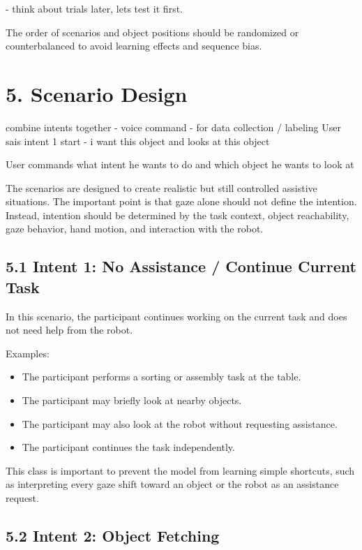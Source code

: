 \documentclass[11pt,a4paper]{article}
\begin{document}
- think about trials later, lets test it first.

The order of scenarios and object positions should be randomized or counterbalanced to avoid learning effects and sequence bias.

\section*{5. Scenario Design}

combine intents together
- voice command - for data collection / labeling 
User sais intent 1 start - i want this object and looks at this object

User commands what intent he wants to do and which object he wants to look at

The scenarios are designed to create realistic but still controlled assistive situations. The important point is that gaze alone should not define the intention. Instead, intention should be determined by the task context, object reachability, gaze behavior, hand motion, and interaction with the robot.

\subsection*{5.1 Intent 1: No Assistance / Continue Current Task}

In this scenario, the participant continues working on the current task and does not need help from the robot.

Examples:
\begin{itemize}
    \item The participant performs a sorting or assembly task at the table.
    \item The participant may briefly look at nearby objects.
    \item The participant may also look at the robot without requesting assistance.
    \item The participant continues the task independently.
\end{itemize}

This class is important to prevent the model from learning simple shortcuts, such as interpreting every gaze shift toward an object or the robot as an assistance request.

\subsection*{5.2 Intent 2: Object Fetching}
\end{document}
